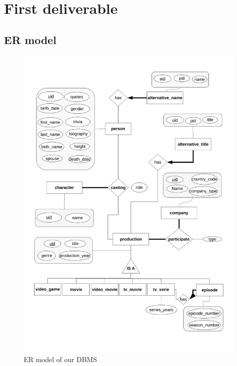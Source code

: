 \documentclass{article}
\begin{document}


\section{First deliverable}
\subsection{ER model}

    \begin{figure}[H]
        \includegraphics[width=\linewidth]{Diagrame_ER.pdf}
        \captionsetup{justification=centering}
        \caption{ER model of our DBMS}
    \end{figure}
\end{document}
